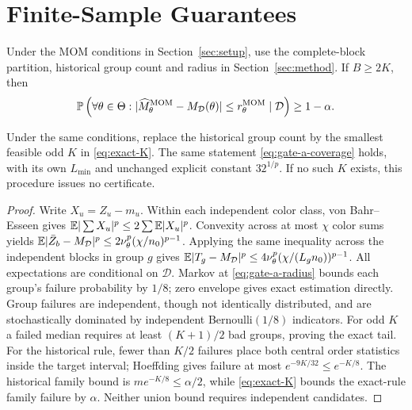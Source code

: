 \section{Finite-Sample Guarantees}
\label{sec:theory}
\begin{theorem}
\label{thm:gate-a-clean}
Under the MOM conditions in Section~\ref{sec:setup}, use the complete-block partition, historical group count and radius in Section~\ref{sec:method}. If $B\ge2K$, then
\begin{equation}
 \mathbb{P}\left(\forall\theta\in\Theta:
 |\widehat M_\theta^{\rm MOM}-M_{\mathcal D}(\theta)|\le r_\theta^{\rm MOM}
 \mid\mathcal D\right)\ge1-\alpha.
 \label{eq:gate-a-coverage}
\end{equation}
\end{theorem}
\begin{theorem}
\label{thm:exact-mom}
Under the same conditions, replace the historical group count by the smallest feasible odd $K$ in \eqref{eq:exact-K}. The same statement \eqref{eq:gate-a-coverage} holds, with its own $L_{\min}$ and unchanged explicit constant $32^{1/p}$. If no such $K$ exists, this procedure issues no certificate.
\end{theorem}
\begin{proof}
Write $X_u=Z_u-m_u$. Within each independent color class, von Bahr--Esseen gives $\mathbb{E}|\sum X_u|^p\le2\sum\mathbb{E}|X_u|^p$. Convexity across at most $\chi$ color sums yields $\mathbb{E}|\bar Z_b-M_{\mathcal D}|^p\le2\nu_\theta^p(\chi/n_0)^{p-1}$. Applying the same inequality across the independent blocks in group $g$ gives
$\mathbb{E}|T_g-M_{\mathcal D}|^p\le4\nu_\theta^p(\chi/(L_gn_0))^{p-1}$.
All expectations are conditional on $\mathcal D$. Markov at \eqref{eq:gate-a-radius} bounds each group's failure probability by $1/8$; zero envelope gives exact estimation directly. Group failures are independent, though not identically distributed, and are stochastically dominated by independent Bernoulli$(1/8)$ indicators. For odd $K$ a failed median requires at least $(K+1)/2$ bad groups, proving the exact tail. For the historical rule, fewer than $K/2$ failures place both central order statistics inside the target interval; Hoeffding gives failure at most $e^{-9K/32}\le e^{-K/8}$. The historical family bound is $me^{-K/8}\le\alpha/2$, while \eqref{eq:exact-K} bounds the exact-rule family failure by $\alpha$. Neither union bound requires independent candidates.
\end{proof}

